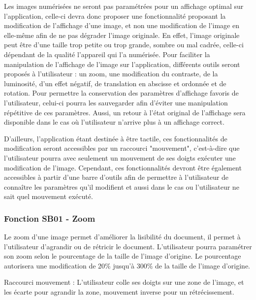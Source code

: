 \documentclass[a4paper]{article}
\begin{document}
Les images numérisées ne seront pas paramétrées pour un affichage optimal sur l’application, celle-ci devra donc proposer une fonctionnalité proposant la modification de l’affichage d’une image, et non une modification de l’image en elle-même afin de ne pas dégrader l’image originale. En effet, l’image originale peut être d’une taille trop petite ou trop grande, sombre ou mal cadrée, celle-ci dépendant de la qualité l’appareil qui l’a numérisée. Pour faciliter la manipulation de l’affichage de l’image sur l’application, différents outils seront proposés à l’utilisateur : un zoom, une modification du contraste, de la luminosité, d’un effet négatif, de translation en abscisse et ordonnée et de rotation. Pour permettre la conservation des paramètres d’affichage favoris de l’utilisateur, celui-ci pourra les sauvegarder afin d’éviter une manipulation répétitive de ces paramètres. Aussi, un retour à l’état original de l’affichage sera disponible dans le cas où l’utilisateur n’arrive plus à un affichage correct.

D'ailleurs, l'application étant destinée à être tactile, ces fonctionnalités de modification seront accessibles par un raccourci "mouvement", c'est-à-dire que l'utilisateur pourra avec seulement un mouvement de ses doigts exécuter une modification de l'image. Cependant, ces fonctionnalités devront être également accessibles à partir d'une barre d'outils afin de permettre à l'utilisateur de connaître les paramètres qu'il modifient et aussi dans le cas ou l'utilisateur ne sait quel mouvement exécuté.


\subsubsection{Fonction SB01 - Zoom}

Le zoom d'une image permet d'améliorer la lisibilité du document, il permet à l'utilisateur d'agrandir ou de rétricir le document. L'utilisateur pourra paramétrer son zoom selon le pourcentage de la taille de l'image d'origine. Le pourcentage autorisera une modification de 20\% jusqu'à 300\% de la taille de l'image d'origine.

Raccourci mouvement : L'utilisateur colle ses doigts sur une zone de l'image, et les écarte pour agrandir la zone, mouvement inverse pour un rétrécissement.
\end{document}
